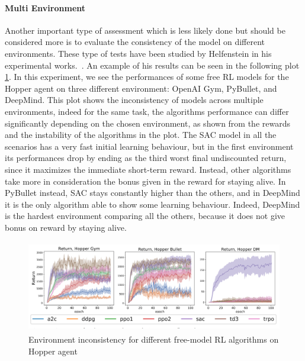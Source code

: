 \documentclass{article}
\begin{document}
\paragraph{Multi Environment}
Another important type of assessment which is less likely done but should be considered more is to evaluate the consistency of the model on different environments. These type of tests have been studied by Helfenstein in his experimental works.~\cite{BenchmarkingDRL}. An example of his results can be seen in the following plot \ref{fig:env}. In this experiment, we see the performances of some free RL models for the Hopper agent on three different environment: OpenAI Gym, PyBullet, and DeepMind. This plot shows the inconsistency of  models across multiple environments, indeed for the same task, the algorithms performance can differ significantly depending on the chosen environment, as shown from the rewards and the instability of the algorithms in the plot.
The SAC model in all the scenarios has a very fast initial learning behaviour, but in the first environment its performances drop by ending as the third worst final undiscounted return, since it maximizes the immediate short-term reward. Instead, other algorithms take more in consideration the bonus given in the reward for staying alive. In PyBullet instead, SAC stays constantly higher than the others, and in DeepMind it is the only algorithm able to show some learning behaviour. Indeed, DeepMind is the hardest environment comparing all the others, because it does not give bonus on reward by staying alive.
\begin{figure}[!htp]
	\centering
	\includegraphics[width=15cm,height=4cm]{./images/Environements_plot.png}
	\caption{Environment inconsistency for different free-model RL algorithms on Hopper agent \cite{BenchmarkingDRL}}
	\label{fig:env}
	\footnotesize{}
\end{figure}
\end{document}
